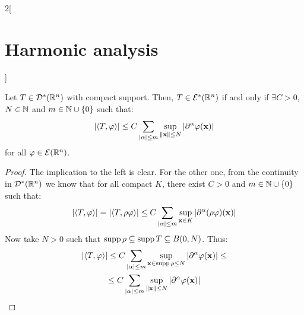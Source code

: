 \documentclass[../../../main_math.tex]{subfiles}
\begin{document}
\begin{multicols}{2}[\section{Harmonic analysis}]
\begin{remark}
  \end{remark}
  \begin{proposition}
    Let $T\in\mathcal{D}^*(\mathbb{R}^n)$ with compact support. Then, $T\in \mathcal{E}^*(\mathbb{R}^n)$ if and only if $\exists C>0$, $N\in\mathbb{N}$ and $m\in \mathbb{N}\cup\{0\}$ such that:
    $$
      \abs{\langle T,\varphi\rangle}\leq C\sum_{\abs{\alpha}\leq m} \sup_{\left\|\boldsymbol{\mathrm{x}}\right\|\leq N}\abs{\partial^\alpha\varphi(\boldsymbol{\mathrm{x}})}
    $$
    for all $\varphi\in\mathcal{E}(\mathbb{R}^n)$.
  \end{proposition}
  \begin{proof}
    The implication to the left is clear. For the other one, from the continuity in $\mathcal{D}^*(\mathbb{R}^n)$ we know that for all compact $K$, there exist $C>0$ and $m\in\mathbb{N}\cup\{0\}$ such that:
    $$
      \abs{\langle T,\varphi\rangle}= \abs{\langle T,\rho\varphi\rangle}\leq C\sum_{\abs{\alpha}\leq m} \sup_{\boldsymbol{\mathrm{x}}\in K}\abs{\partial^\alpha(\rho\varphi)(\boldsymbol{\mathrm{x}})}
    $$
    Now take $N>0$ such that $\operatorname{supp}\rho\subseteq\operatorname{supp} T\subseteq B(0,N)$. Thus:
    \begin{multline*}
      \abs{\langle T,\varphi\rangle}\leq C\sum_{\abs{\alpha}\leq m} \sup_{\boldsymbol{\mathrm{x}}\in \operatorname{supp}\rho\leq N}\abs{\partial^\alpha\varphi(\boldsymbol{\mathrm{x}})}\leq\\
      \leq C\sum_{\abs{\alpha}\leq m} \sup_{\left\|\boldsymbol{\mathrm{x}}\right\|\leq N}\abs{\partial^\alpha\varphi(\boldsymbol{\mathrm{x}})}
    \end{multline*}
  \end{proof}

\end{multicols}
\end{document}
